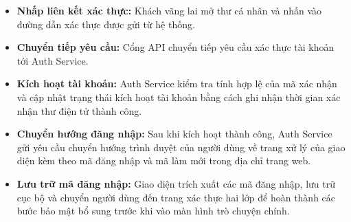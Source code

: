 \begin{itemize}

\item \textbf{Nhấp liên kết xác thực:}
Khách vãng lai mở thư cá nhân
và nhấn vào đường dẫn xác thực được gửi từ hệ thống.

\item \textbf{Chuyển tiếp yêu cầu:}
Cổng API chuyển tiếp yêu cầu xác thực tài khoản tới Auth Service.

\item \textbf{Kích hoạt tài khoản:}
Auth Service kiểm tra tính hợp lệ của mã xác nhận
và cập nhật trạng thái kích hoạt tài khoản
bằng cách ghi nhận thời gian xác nhận thư điện tử thành công.

\item \textbf{Chuyển hướng đăng nhập:}
Sau khi kích hoạt thành công,
Auth Service gửi yêu cầu chuyển hướng trình duyệt của người dùng
về trang xử lý của giao diện kèm theo mã đăng nhập
và mã làm mới trong địa chỉ trang web.

\item \textbf{Lưu trữ mã đăng nhập:}
Giao diện trích xuất các mã đăng nhập,
lưu trữ cục bộ và
chuyển người dùng đến trang xác thực hai lớp
để hoàn thành các bước bảo mật bổ sung trước khi vào màn hình trò chuyện chính.
\end{itemize}
